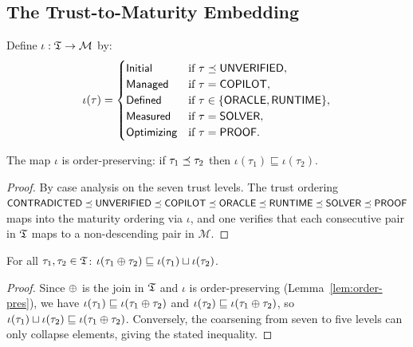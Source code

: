 \documentclass[11pt]{article}
\begin{document}
\subsection{The Trust-to-Maturity Embedding}\label{subsec:trust-embed}

\begin{definition}\label{def:trust-to-mat}
Define $\iota : \mathfrak{T} \to \mathcal{M}$ by:
\[
  \iota(\tau) = \begin{cases}
    \textsf{Initial}    & \text{if } \tau \preceq \mathsf{UNVERIFIED}, \\
    \textsf{Managed}    & \text{if } \tau = \mathsf{COPILOT}, \\
    \textsf{Defined}    & \text{if } \tau \in \{\mathsf{ORACLE}, \mathsf{RUNTIME}\}, \\
    \textsf{Measured}   & \text{if } \tau = \mathsf{SOLVER}, \\
    \textsf{Optimizing} & \text{if } \tau = \mathsf{PROOF}.
  \end{cases}
\]
\end{definition}

\begin{lemma}\label{lem:order-pres}
The map $\iota$ is order-preserving: if $\tau_1 \preceq \tau_2$ then
$\iota(\tau_1) \sqsubseteq \iota(\tau_2)$.
\end{lemma}

\begin{proof}
By case analysis on the seven trust levels.  The trust ordering
$\mathsf{CONTRADICTED} \preceq \mathsf{UNVERIFIED} \preceq \mathsf{COPILOT} \preceq \mathsf{ORACLE} \preceq
\mathsf{RUNTIME} \preceq \mathsf{SOLVER} \preceq \mathsf{PROOF}$ maps into the maturity
ordering via $\iota$, and one verifies that each consecutive pair
in $\mathfrak{T}$ maps to a non-descending pair in $\mathcal{M}$.
\end{proof}

\begin{lemma}\label{lem:join-compat}
For all $\tau_1, \tau_2 \in \mathfrak{T}$:
$\iota(\tau_1 \oplus \tau_2) \sqsubseteq
\iota(\tau_1) \sqcup \iota(\tau_2)$.
\end{lemma}

\begin{proof}
Since $\oplus$ is the join in $\mathfrak{T}$ and $\iota$ is order-preserving
(Lemma~\ref{lem:order-pres}), we have
$\iota(\tau_1) \sqsubseteq \iota(\tau_1 \oplus \tau_2)$ and
$\iota(\tau_2) \sqsubseteq \iota(\tau_1 \oplus \tau_2)$, so
$\iota(\tau_1) \sqcup \iota(\tau_2) \sqsubseteq
\iota(\tau_1 \oplus \tau_2)$.  Conversely, the coarsening from seven
to five levels can only collapse elements, giving the stated inequality.
\end{proof}
\end{document}
